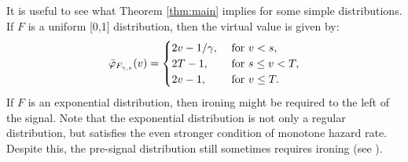 It is useful to see what Theorem \ref{thm:main} implies for some simple distributions. If $F$ is a uniform [0,1] distribution, then the virtual value is given by:
  \begin{equation*} \bar \varphi_{F_{\gamma,s}}(v) =   \begin{cases}
     2v - 1/\gamma, &\hbox{ for } v < s,\\
     2T - 1, &\hbox{ for } s \leq v < T,\\
     2v - 1, &\hbox{ for } v \leq  T.\\
 \end{cases}\end{equation*}
 If $F$ is an exponential distribution, then ironing might be required to the left of the signal. Note that the exponential distribution is not only a regular distribution, but satisfies the even stronger condition of monotone hazard rate. Despite this, the pre-signal distribution still sometimes requires ironing (see ).

